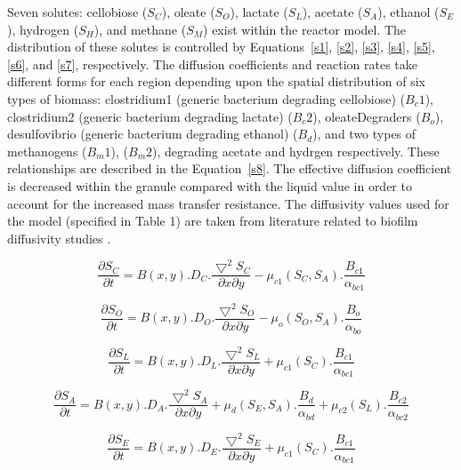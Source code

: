 Seven solutes: cellobiose ($S_{C}$), oleate ($S_{O}$), lactate ($S_{L}$), acetate ($S_{A}$), ethanol ($S_{E}$), hydrogen ($S_{H}$), and methane ($S_{M}$) exist within the reactor model. The distribution of these solutes is controlled by Equations~\ref{s1}, \ref{s2}, \ref{s3}, \ref{s4}, \ref{s5}, \ref{s6}, and \ref{s7}, respectively. The diffusion coefficients and reaction rates take different forms for each region depending upon the spatial distribution of six types of biomass: clostridium1 (generic bacterium degrading cellobiose) ($B_c1$), clostridium2 (generic bacterium degrading lactate) ($B_c2$), oleateDegraders ($B_o$), desulfovibrio (generic bacterium degrading ethanol) ($B_d$), and two types of methanogens ($B_m1$), ($B_m2$), degrading acetate and hydrgen respectively. These relationships are described in the Equation~\ref{s8}. 
The effective diffusion coefficient is decreased within the granule compared with the liquid value in order to account for the increased mass transfer resistance. The diffusivity values used for the model (specified in  Table 1) are taken from literature related to biofilm diffusivity studies \cite{stewart2003diffusion,lens2003diffusional}.


\begin{equation}
\frac{\partial S_{C}}{\partial t} = B(x,y).D_{C}.\frac{\bigtriangledown^{2} S_{C}}{{\partial x}{\partial y}}- \mu_{c1}(S_{C},S_{A}).\frac{B_{c1}}{\alpha_{bc1}}
\label{s1}
\end{equation}

\begin{equation}
\frac{\partial S_{O}}{\partial t} = B(x,y).D_{O}.\frac{\bigtriangledown^{2} S_{O}}{{\partial x}{\partial y}}- \mu_{o}(S_{O},S_{A}).\frac{B_{o}}{\alpha_{bo}}
\label{s2}
\end{equation}

\begin{equation}
\frac{\partial S_{L}}{\partial t} = B(x,y).D_{L}.\frac{\bigtriangledown^{2} S_{L}}{{\partial x}{\partial y}}+ \mu_{c1}(S_{C}).\frac{B_{c1}}{\alpha_{bc1}}
\label{s3}
\end{equation}

\begin{equation}
\frac{\partial S_{A}}{\partial t} = B(x,y).D_{A}.\frac{\bigtriangledown^{2} S_{A}}{{\partial x}{\partial y}}+ \mu_{d}(S_{E},S_{A}).\frac{B_{d}}{\alpha_{bd}}+ \mu_{c2}(S_{L}).\frac{B_{c2}}{\alpha_{bc2}}
\label{s4}
\end{equation}

\begin{equation}
\frac{\partial S_{E}}{\partial t} = B(x,y).D_{E}.\frac{\bigtriangledown^{2} S_{E}}{{\partial x}{\partial y}}+ \mu_{c1}(S_{C}).\frac{B_{c1}}{\alpha_{bc1}}
\label{s5}
\end{equation}

